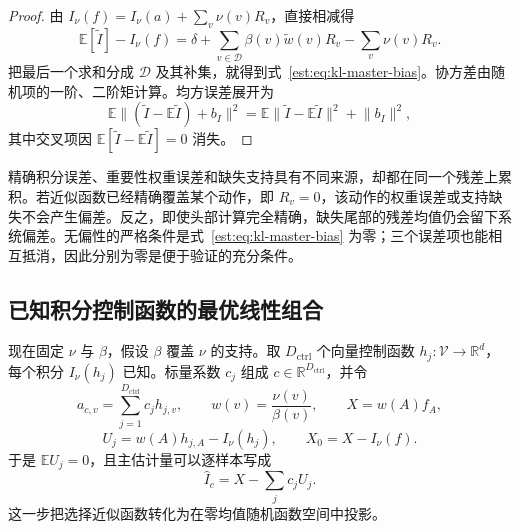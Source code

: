 \documentclass[lang=cn,scheme=chinese,openany]{../book/elegantbook}
\newcommand{\E}{\mathbb E}
\begin{document}
\begin{proof}
由 $I_\nu(f)=I_\nu(a)+\sum_v\nu(v)R_v$，直接相减得
\begin{equation*}
 \E[\widetilde I]-I_\nu(f)
 =\delta+\sum_{v\in\mathcal D}\beta(v)\widetilde w(v)R_v-\sum_v\nu(v)R_v.
\end{equation*}
把最后一个求和分成 $\mathcal D$ 及其补集，就得到式~\eqref{est:eq:kl-master-bias}。协方差由随机项的一阶、二阶矩计算。均方误差展开为
\begin{equation*}
 \E\lVert(\widetilde I-\E\widetilde I)+b_I\rVert^2
 =\E\lVert\widetilde I-\E\widetilde I\rVert^2+\lVert b_I\rVert^2,
\end{equation*}
其中交叉项因 $\E[\widetilde I-\E\widetilde I]=0$ 消失。
\end{proof}

精确积分误差、重要性权重误差和缺失支持具有不同来源，却都在同一个残差上累积。若近似函数已经精确覆盖某个动作，即 $R_v=0$，该动作的权重误差或支持缺失不会产生偏差。反之，即使头部计算完全精确，缺失尾部的残差均值仍会留下系统偏差。无偏性的严格条件是式~\eqref{est:eq:kl-master-bias} 为零；三个误差项也能相互抵消，因此分别为零是便于验证的充分条件。

\subsection{已知积分控制函数的最优线性组合}

现在固定 $\nu$ 与 $\beta$，假设 $\beta$ 覆盖 $\nu$ 的支持。取 $D_{\mathrm{ctrl}}$ 个向量控制函数 $h_j:\mathcal V\to\mathbb R^d$，每个积分 $I_\nu(h_j)$ 已知。标量系数 $c_j$ 组成 $c\in\mathbb R^{D_{\mathrm{ctrl}}}$，并令
\begin{equation*}
 a_{c,v}=\sum_{j=1}^{D_{\mathrm{ctrl}}} c_jh_{j,v},\qquad
 w(v)=\frac{\nu(v)}{\beta(v)},\qquad X=w(A)f_A,
\end{equation*}
\begin{equation*}
 U_j=w(A)h_{j,A}-I_\nu(h_j),\qquad
 X_0=X-I_\nu(f).
\end{equation*}
于是 $\E U_j=0$，且主估计量可以逐样本写成
\begin{equation*}
 \widehat I_c=X-\sum_jc_jU_j.
\end{equation*}
这一步把选择近似函数转化为在零均值随机函数空间中投影。
\end{document}
